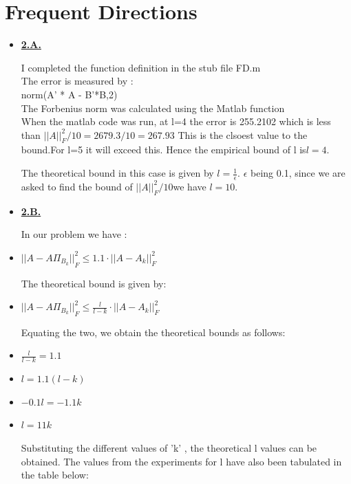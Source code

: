 \documentclass[11pt]{article}
\begin{document}
\section{Frequent Directions}

\begin{itemize}
	\item[] \underline{\textbf{2.A.}}
	
	I completed the function definition in the stub file FD.m\\
	
	The error is measured by :\\
	norm(A' * A - B'*B,2)\\
	
	The Forbenius norm was calculated using the Matlab function \\
	
	 When the matlab code was run, at l=4 the error is 255.2102 which is less than ${||A||}_{F}^{2}/10 =2679.3/10= 267.93$
	This is the clsoest value to the bound.For l=5 it will exceed this.
	Hence the empirical bound of l is$\boxed{ l=4.}$ 
	
	The theoretical bound in this case is given by $l=\frac{1}{\epsilon} $.  $\epsilon$ being 0.1, since we are asked to find the bound of $||A||_F^2/10 $we have $\boxed{l=10}$.
	
	
	
	\item[] \underline{\textbf{2.B.}}
	
	In our problem we have :\\
	\item[] ${||A-A\Pi_{B_k}||}_{F}^{2}    \leq 1.1   \cdot {||A-A_k||}_{F}^{2}$
	
	The theoretical bound is given by:\\
	\item[] 	${||A-A\Pi_{B_k}||}_{F}^{2}    \leq \frac{l}{l-k}   \cdot {||A-A_k||}_{F}^{2}$
		
	Equating the two, we obtain the theoretical bounds as follows:
	
	
	\item[] $\frac{l}{l-k} =1.1$
	\item[] 	$l=1.1(l-k)$
		\item[] $-0.1l=-1.1k$
		\item[] $\boxed{l=11k}$
	
	Substituting the different values of 'k' , the theoretical l values can be obtained. The values from the experiments for l have also been tabulated in the table below:
	

\end{itemize}
\end{document}
